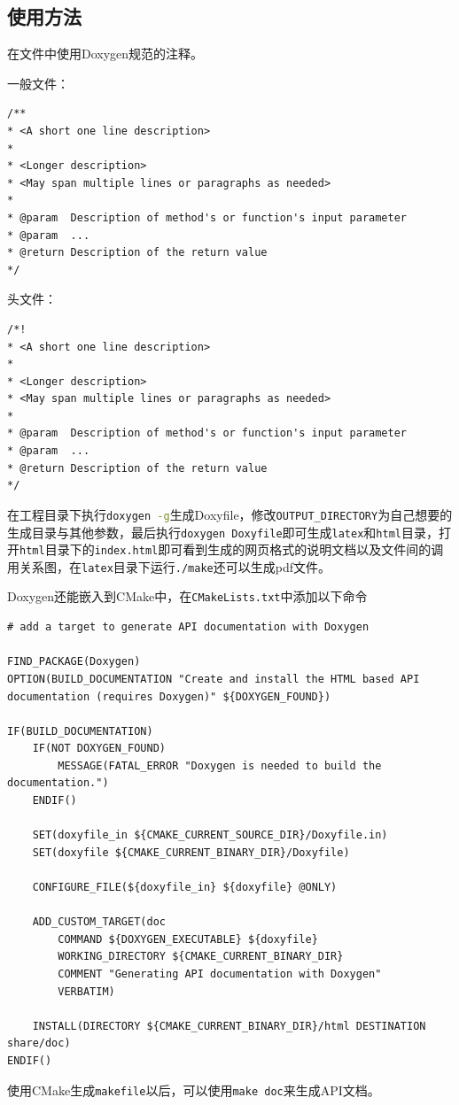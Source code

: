 		\subsection{使用方法}
			\par 在文件中使用Doxygen规范的注释。
			\par 一般文件：
			\begin{lstlisting}
/**
* <A short one line description>
*
* <Longer description>
* <May span multiple lines or paragraphs as needed>
*
* @param  Description of method's or function's input parameter
* @param  ...
* @return Description of the return value
*/
			\end{lstlisting}
			\par 头文件：
			\begin{lstlisting}
/*!
* <A short one line description>
*
* <Longer description>
* <May span multiple lines or paragraphs as needed>
*
* @param  Description of method's or function's input parameter
* @param  ...
* @return Description of the return value
*/
			\end{lstlisting}
			\par 在工程目录下执行\lstinline[language=sh]{doxygen -g}生成Doxyfile，修改\lstinline{OUTPUT_DIRECTORY}为自己想要的生成目录与其他参数，最后执行\lstinline{doxygen Doxyfile}即可生成\lstinline{latex}和\lstinline{html}目录，打开\lstinline{html}目录下的\lstinline{index.html}即可看到生成的网页格式的说明文档以及文件间的调用关系图，在\lstinline{latex}目录下运行\lstinline{./make}还可以生成pdf文件。
			\par Doxygen还能嵌入到CMake中，在\lstinline{CMakeLists.txt}中添加以下命令
			\begin{lstlisting}
# add a target to generate API documentation with Doxygen

FIND_PACKAGE(Doxygen)
OPTION(BUILD_DOCUMENTATION "Create and install the HTML based API documentation (requires Doxygen)" ${DOXYGEN_FOUND})

IF(BUILD_DOCUMENTATION)
	IF(NOT DOXYGEN_FOUND)
		MESSAGE(FATAL_ERROR "Doxygen is needed to build the documentation.")
	ENDIF()

	SET(doxyfile_in ${CMAKE_CURRENT_SOURCE_DIR}/Doxyfile.in)
	SET(doxyfile ${CMAKE_CURRENT_BINARY_DIR}/Doxyfile)

	CONFIGURE_FILE(${doxyfile_in} ${doxyfile} @ONLY)

	ADD_CUSTOM_TARGET(doc
		COMMAND ${DOXYGEN_EXECUTABLE} ${doxyfile}
		WORKING_DIRECTORY ${CMAKE_CURRENT_BINARY_DIR}
		COMMENT "Generating API documentation with Doxygen"
		VERBATIM)

	INSTALL(DIRECTORY ${CMAKE_CURRENT_BINARY_DIR}/html DESTINATION share/doc)
ENDIF()
			\end{lstlisting}
			\par 使用CMake生成\lstinline{makefile}以后，可以使用\lstinline{make doc}来生成API文档。
